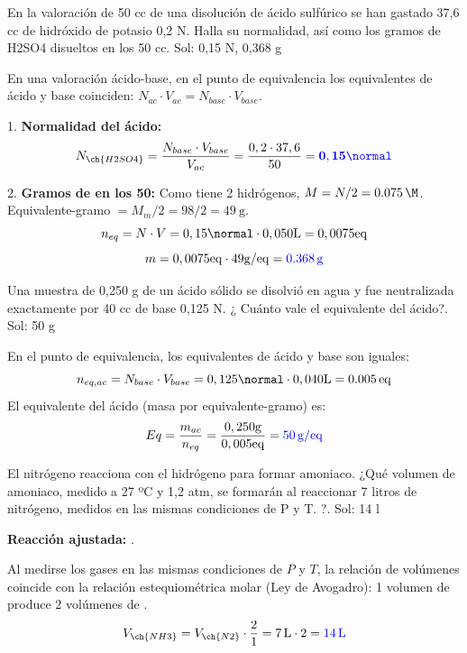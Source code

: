 \begin{exercise}
    En la valoración de 50 cc de una disolución de ácido sulfúrico se han gastado 37,6 cc de hidróxido de potasio 0,2 N. Halla su normalidad, así como los gramos de H2SO4 disueltos en los 50 cc. Sol: 0,15 N, 0,368 g
    \begin{solu}
        En una valoración ácido-base, en el punto de equivalencia los equivalentes de ácido y base coinciden: $N_{ac} \cdot V_{ac} = N_{base} \cdot V_{base}$.

        1. \textbf{Normalidad del ácido:}
        \[ N_{\ch{H2SO4}} = \dfrac{N_{base} \cdot V_{base}}{V_{ac}} = \dfrac{0,2 \cdot 37,6}{50} = \mathbf{\textcolor{blue}{0,15 \si{\normal}}} \]

        2. \textbf{Gramos de  en los \qty{50}{\cc}:} Como  tiene 2 hidrógenos, $M = N/2 = \qty{0,075}{\M}$. Equivalente-gramo $= M_m/2 = 98/2 = \qty{49}{\g}$.
        \[ n_{eq} = N \cdot V = 0,15 \si{\normal} \cdot 0,050 \si{\L} = 0,0075 \si{eq} \]
        \[ m = 0,0075 \si{eq} \cdot 49 \si{\g\per eq} = \mathbf{\textcolor{blue}{\qty{0,368}{\g}}} \]
    \end{solu}
\end{exercise}

\begin{exercise}
    Una muestra de 0,250 g de un ácido sólido se disolvió en agua y fue neutralizada exactamente por 40 cc de base 0,125 N. ¿ Cuánto vale el equivalente del ácido?. Sol: 50 g
    \begin{solu}
        En el punto de equivalencia, los equivalentes de ácido y base son iguales:
        \[ n_{eq,ac} = N_{base} \cdot V_{base} = 0,125 \si{\normal} \cdot 0,040 \si{\L} = \qty{0,005}{eq} \]
        El equivalente del ácido (masa por equivalente-gramo) es:
        \[ Eq = \dfrac{m_{ac}}{n_{eq}} = \dfrac{0,250 \si{\g}}{0,005 \si{eq}} = \mathbf{\textcolor{blue}{\qty{50}{\g\per eq}}} \]
    \end{solu}
\end{exercise}


\begin{exercise}
    El nitrógeno reacciona con el hidrógeno para formar amoniaco. ¿Qué volumen de amoniaco, medido a 27 ºC y 1,2 atm, se formarán al reaccionar 7 litros de nitrógeno, medidos en las mismas condiciones de P y T. ?. Sol: 14 l
    \begin{solu}
        \textbf{Reacción ajustada:} .

        Al medirse los gases en las mismas condiciones de $P$ y $T$, la relación de volúmenes coincide con la relación estequiométrica molar (Ley de Avogadro): 1 volumen de  produce 2 volúmenes de .
        \[ V_{\ch{NH3}} = V_{\ch{N2}} \cdot \dfrac{2}{1} = \qty{7}{\L} \cdot 2 = \mathbf{\textcolor{blue}{\qty{14}{\L}}} \]
    \end{solu}
\end{exercise}



